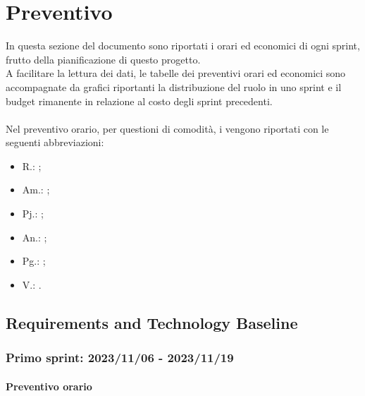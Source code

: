\chapter{Preventivo}\label{chap:preventivo}
In questa sezione del documento sono riportati i  orari ed economici di ogni sprint, frutto della pianificazione di questo progetto.\\
A facilitare la lettura dei dati, le tabelle dei preventivi orari ed economici sono accompagnate da grafici riportanti la distribuzione del ruolo in uno sprint e il budget rimanente in relazione al costo degli sprint precedenti.\\ \\
Nel preventivo orario, per questioni di comodità, i  vengono riportati con le seguenti abbreviazioni:
\begin{itemize}
    \item R.: ;
    \item Am.: ;
    \item Pj.: ;
    \item An.: ;
    \item Pg.: ;
    \item V.: .
\end{itemize}
\newpage

\section{Requirements and Technology Baseline}

\subsection{Primo sprint: 2023/11/06 - 2023/11/19}
\subsubsection{Preventivo orario}

